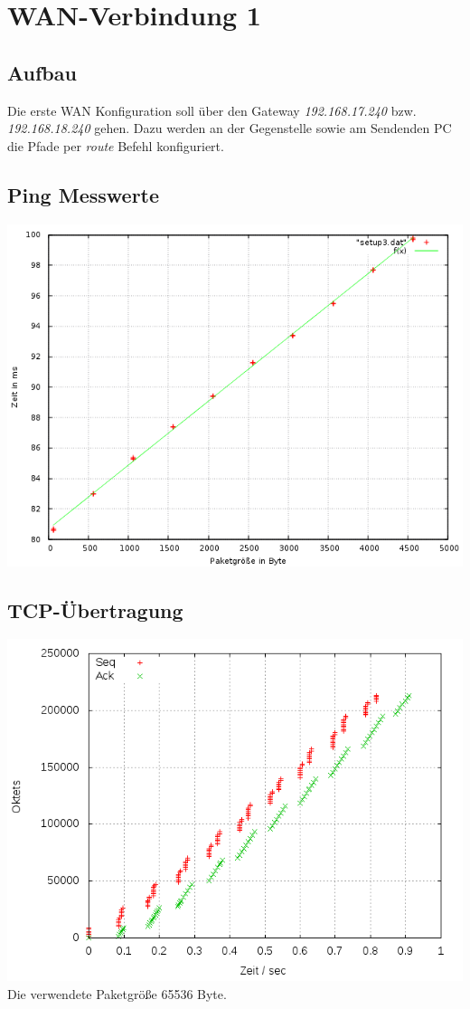 \documentclass[a4paper,10pt]{article}
\begin{document}
\section{WAN-Verbindung 1}

\subsection{Aufbau}
Die erste WAN Konfiguration soll über den Gateway \textit{192.168.17.240} bzw. \textit{192.168.18.240} gehen. Dazu werden
an der Gegenstelle sowie am Sendenden PC die Pfade per \textit{route} Befehl konfiguriert.

\subsection{Ping Messwerte}
\includegraphics[scale=0.75]{ping_setup_wan1.png}

\subsection{TCP-Übertragung}
\includegraphics[scale=0.75]{setup_wan1.png}
Die verwendete Paketgröße 65536 Byte.
\end{document}
